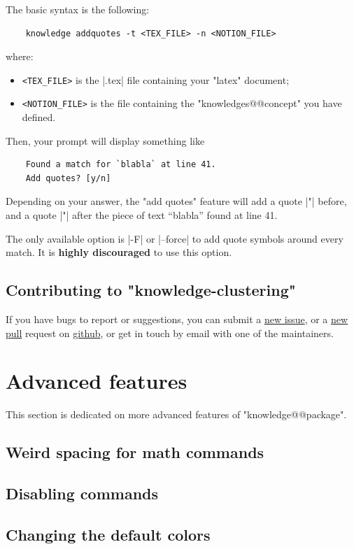 \documentclass{article}
\begin{document}
The basic syntax is the following:
\begin{verbatim}
    knowledge addquotes -t <TEX_FILE> -n <NOTION_FILE> 
\end{verbatim}
where:
\begin{itemize}
    \item \texttt{<TEX\_FILE>} is the \spverb|.tex| file containing your "latex"
    document;
    \item \texttt{<NOTION\_FILE>} is the file containing the
    "knowledges@@concept" you have defined.
\end{itemize}
Then, your prompt will display something like
\begin{verbatim}
    Found a match for `blabla` at line 41.
    Add quotes? [y/n]
\end{verbatim}
Depending on your answer, the "add quotes" feature will add a quote
%
\spverb|"| before, and a quote \spverb|"| after 
%
the piece of text ``blabla'' found at line 41.

The only available option is \spverb|-F| or \spverb|--force| to add
quote symbols around every match. It is \textbf{highly discouraged}
to use this option. 

\subsection{Contributing to "knowledge-clustering"}

If you have bugs to report or suggestions, you can submit a
\href{https://github.com/remimorvan/knowledge-clustering/issues}{new issue},
or a \href{https://github.com/remimorvan/knowledge-examples/pulls}{new pull} 
request on \href{https://github.com/remimorvan/knowledge-examples}{github}, or get in touch by email with
one of the maintainers.


\section{Advanced features}
\label{sec:advanced-features}

This section is dedicated on more advanced features of "knowledge@@package".

\subsection{Weird spacing for math commands}

\subsection{Disabling commands}

\subsection{Changing the default colors}
\end{document}
